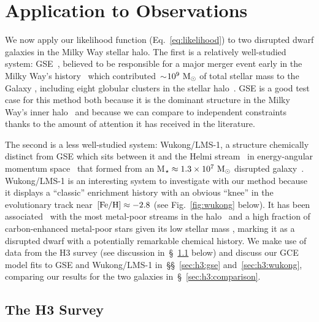 
\section{Application to Observations}
\label{sec:h3}

We now apply our likelihood function (Eq.~\ref{eq:likelihood}) to two
disrupted dwarf galaxies in the Milky Way stellar halo.
The first is a relatively well-studied system: GSE~\citep{Belokurov2018,
Helmi2018, Haywood2018, Myeong2018, Mackereth2019}, believed to be responsible
for a major merger event early in the Milky Way's history~\citep{Gallart2019,
Bonaca2020, Chaplin2020, Montalban2021, Xiang2022} which
contributed~$\sim$$10^9~\text{M}_\odot$ of total stellar mass to the Galaxy
\citep{Deason2019, Fattahi2019, Mackereth2019, Vincenzo2019b, Kruijssen2020,
Han2022}, including eight globular clusters in the stellar
halo~\citep{Myeong2018, Massari2019, Kruijssen2019, Forbes2020}.
GSE is a good test case for this method both because it is the dominant
structure in the Milky Way's inner halo~\citep{Helmi2018} and because we can
compare to independent constraints thanks to the amount of attention it has
received in the literature.



The second is a less well-studied system: Wukong/LMS-1, a structure chemically
distinct from GSE which sits between it and the Helmi stream~\citep{Helmi1999}
in energy-angular momentum space~\citep{Naidu2020, Yuan2020} that
formed from an M$_\star \approx 1.3\times10^{7}~\text{M}_\odot$ disrupted
galaxy~\citep{Naidu2022}.
Wukong/LMS-1 is an interesting system to investigate with our method
because it displays a ``classic'' enrichment history with an obvious ``knee''
in the evolutionary track near~$\text{[Fe/H]} \approx -2.8$ (see Fig.~\ref{fig:wukong}
below).
It has been associated~\citep{Malhan2022} with the most metal-poor streams in
the halo~\citep[e.g.,][]{Roederer2019, Wan2020, Martin2022} and a high fraction
of carbon-enhanced metal-poor stars given its low stellar mass
\citep{Shank2022, Zepeda2023}, marking it as a disrupted dwarf with a
potentially remarkable chemical history.
We make use of data from the H3 survey (see discussion
in~\S~\ref{sec:h3:survey} below) and discuss our GCE model fits to GSE and
Wukong/LMS-1 in~\S\S~\ref{sec:h3:gse} and~\ref{sec:h3:wukong}, comparing our
results for the two galaxies in~\S~\ref{sec:h3:comparison}.

\subsection{The H3 Survey}
\label{sec:h3:survey}

